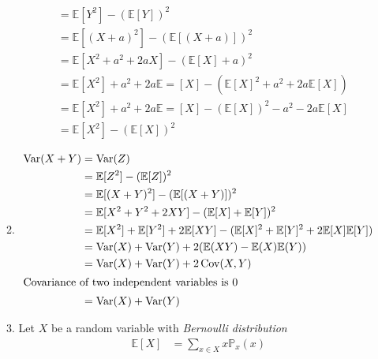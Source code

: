 \documentclass[pdftex,12pt,a4paper]{article}
\begin{document}
\begin{enumerate}
\begin{enumerate}
\begin{align}
                                              &= \mathbb{E}[Y^2] - (\mathbb{E}[Y])^2\\
                                              &= \mathbb{E}[(X+a)^2] - (\mathbb{E}[(X+a)])^2\\
                                              &= \mathbb{E}[X^2 + a^2 + 2aX] - (\mathbb{E}[X] + a)^2\\
                                              &= \mathbb{E}[X^2]+ a^2 + 2a\mathbb{E}=[X] - (\mathbb{E}[X]^2 + a^2 + 2a\mathbb{E}[X])\\
                                              &= \mathbb{E}[X^2]+ a^2 + 2a\mathbb{E}=[X] - (\mathbb{E}[X])^2 - a^2 - 2a\mathbb{E}[X]\\
                                              &= \mathbb{E}[X^2] - (\mathbb{E}[X])^2
                \end{align}
            \item
                \begin{align}
                    \operatorname{Var}(X + Y) &= \operatorname{Var}(Z)\\
                                              &= \mathbb{E}[Z^2] - (\mathbb{E}[Z])^2\\
                                              &= \mathbb{E}[(X+Y)^2] - (\mathbb{E}[(X+Y)])^2\\
                                              &= \mathbb{E}[X^2+Y^2+2XY] - (\mathbb{E}[X]+\mathbb{E}[Y])^2\\
                                              &= \mathbb{E}[X^2]+\mathbb{E}[Y^2]+2\mathbb{E}[XY] - (\mathbb{E}[X]^2+\mathbb{E}[Y]^2+2\mathbb{E}[X]\mathbb{E}[Y])\\
                                              &= \operatorname{Var}(X) + \operatorname{Var}(Y) + 2(\mathbb{E}(XY)-\mathbb{E}(X)\mathbb{E}(Y))\\
                                              &= \operatorname{Var}(X) + \operatorname{Var}(Y) + 2\operatorname{Cov}(X,Y)\\
                                              \intertext{Covariance of two independent variables is 0}
                                              &= \operatorname{Var}(X) + \operatorname{Var}(Y)
                \end{align}
            \item Let $X$ be a random variable with \textit{Bernoulli distribution}
                \begin{align}
                    \mathbb{E}[X] &= \sum_{x\in X}x\mathbb{P}_x(x)\\

\end{align}
\end{enumerate}
\end{enumerate}
\end{document}

